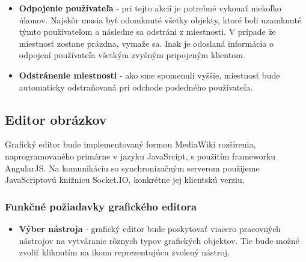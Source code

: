 \begin{itemize}
	\item \textbf{Odpojenie používateľa} - pri tejto akcií je potrebné vykonať niekoľko úkonov. Najskôr musia byť odomknuté všetky objekty, ktoré boli uzamknuté týmto používateľom a následne sa odstráni z miestnosti. V prípade že miestnosť zostane prázdna, vymaže sa. Inak je odoslaná informácia o odpojení používateľa všetkým zvyšným pripojeným klientom.
	
	\item \textbf{Odstránenie miestnosti} - ako sme spomenuli vyššie, miestnosť bude automaticky odstraňovaná pri odchode posledného používateľa.
	
\end{itemize}

\subsection{Editor obrázkov}
Grafický editor bude implementovaný formou MediaWiki rozšírenia, naprogramovaného primárne v jazyku JavaSrcipt, s použitím frameworku AngularJS. Na komunikáciu so synchronizačným serverom použijeme JavaScriptovú knižnicu Socket.IO, konkrétne jej klientskú verziu. 

\subsubsection{Funkčné požiadavky grafického editora}
\begin{itemize}
	\item \textbf{Výber nástroja} - grafický editor bude poskytovať viacero pracovných nástrojov na vytváranie rôznych typov grafických objektov. Tie bude možné zvoliť kliknutím na ikonu reprezentujúcu zvolený nástroj. 
\end{itemize}


